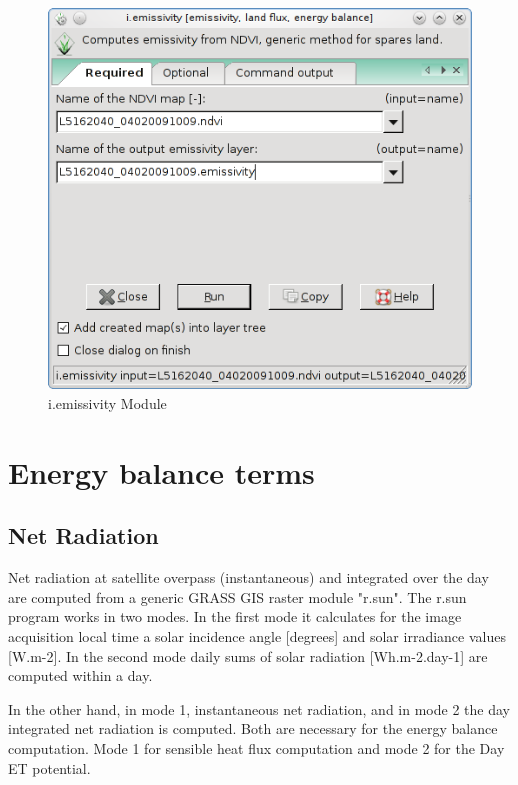 \begin{figure}[htbp]
   \centering
   \includegraphics[scale=0.4]{gipe021.png}
   \caption{i.emissivity Module}
   \label{fig:gipe021}
\end{figure}


\section{Energy balance terms}
\subsection{Net Radiation}
Net radiation at satellite overpass (instantaneous) and integrated over the day are computed from a generic GRASS GIS raster module "r.sun". 
The r.sun program works in two modes. In the first mode it calculates for the image acquisition local time a solar incidence angle [degrees] and solar irradiance values [W.m-2]. In the second mode daily sums of solar radiation [Wh.m-2.day-1] are computed within a day.\newline

In the other hand, in mode 1, instantaneous net radiation, and in mode 2 the day integrated net radiation is computed. Both are necessary for the energy balance computation. Mode 1 for sensible heat flux computation and mode 2 for the Day ET potential.\newline

